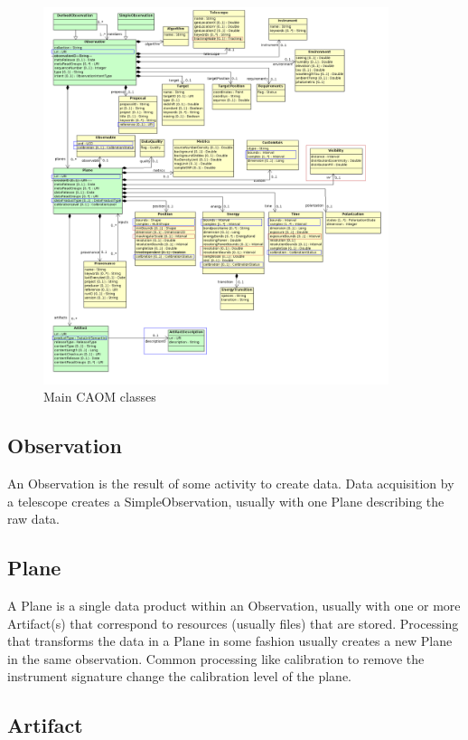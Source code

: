 \documentclass[11pt,a4paper]{ivoa}
\begin{document}
\begin{figure}
\centering
\includegraphics[width=0.9\textwidth]{src/uml/CAOM1core.png}
\caption{Main CAOM classes}
\label{fig:core}
\end{figure}

\subsection{Observation}

An Observation is the result of some activity to create data. Data acquisition by a 
telescope creates a SimpleObservation, usually with one Plane describing the raw 
data.

\subsection{Plane}

A Plane is a single data product within an Observation, usually with one or more
Artifact(s) that correspond to resources (usually files) that are stored. Processing
that transforms the data in a Plane in some fashion usually creates a new Plane in
the same observation. Common processing like calibration to remove the instrument
signature change the calibration level of the plane.

\subsection{Artifact}
\end{document}
